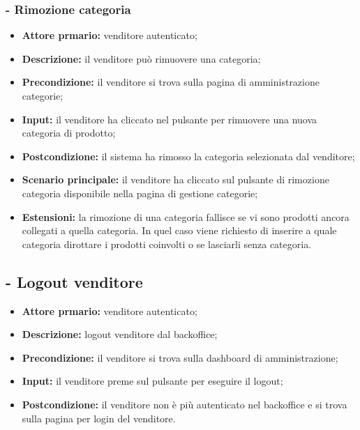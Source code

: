 \subsubsection{- Rimozione categoria}
\begin{itemize}
    \item \textbf{Attore prmario:} venditore autenticato;
    \item \textbf{Descrizione:} il venditore può rimuovere una categoria;
    \item \textbf{Precondizione:} il venditore si trova sulla pagina di amministrazione categorie;
    \item \textbf{Input:} il venditore ha cliccato nel pulsante per rimuovere una nuova categoria di prodotto;
    \item \textbf{Postcondizione:} il sistema ha rimosso la categoria selezionata dal venditore;
    \item \textbf{Scenario principale:} il venditore ha cliccato sul pulsante di rimozione categoria disponibile nella pagina di gestione categorie;
    \item \textbf{Estensioni:} la rimozione di una categoria fallisce se vi sono prodotti ancora collegati a quella categoria. In quel caso viene richiesto
          di inserire a quale categoria dirottare i prodotti coinvolti o se lasciarli senza categoria.
\end{itemize}

\stepUserCase
\subsection{ - Logout venditore}
\begin{itemize}
    \item \textbf{Attore prmario:} venditore autenticato;
    \item \textbf{Descrizione:} logout venditore dal backoffice;
    \item \textbf{Precondizione:} il venditore si trova sulla dashboard di amministrazione;
    \item \textbf{Input:} il venditore preme sul pulsante per eseguire il logout;
    \item \textbf{Postcondizione:} il venditore non è più autenticato nel backoffice e si trova sulla pagina per login del venditore.
\end{itemize}

\stepUserCase
